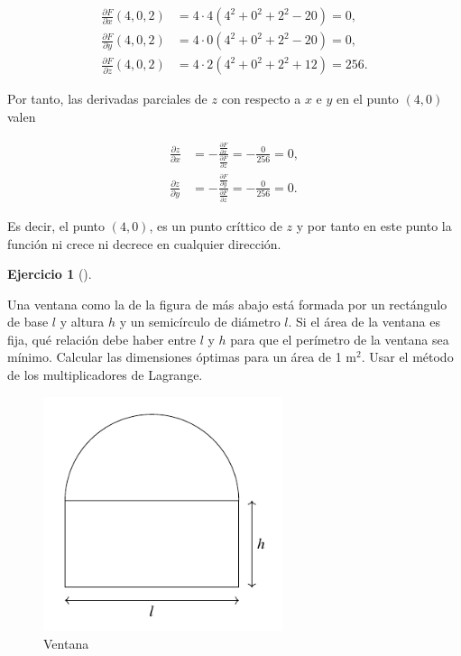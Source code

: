 \documentclass[
  a4paper,
]{scrreport}
\theoremstyle{definition}
\newtheorem{exercise}{Ejercicio}[chapter]
\theoremstyle{remark}
\begin{document}
\begin{tcolorbox}
\begin{enumerate}
  \begin{align*}
  \frac{\partial F}{\partial x}(4,0,2)
  &= 4\cdot 4(4^2+0^2+2^2-20) = 0, \\
  \frac{\partial F}{\partial y}(4,0,2)
  &= 4\cdot 0(4^2+0^2+2^2-20) = 0, \\
  \frac{\partial F}{\partial z}(4,0,2)
  &= 4\cdot 2(4^2+0^2+2^2+12) = 256.
  \end{align*}

  Por tanto, las derivadas parciales de \(z\) con respecto a \(x\) e
  \(y\) en el punto \((4,0)\) valen

  \begin{align*}
  \frac{\partial z}{\partial x}
  &= -\frac{\frac{\partial F}{\partial x}}{\frac{\partial F}{\partial z}}
  = -\frac{0}{256} = 0, \\
  \frac{\partial z}{\partial y}
  &= -\frac{\frac{\partial F}{\partial y}}{\frac{\partial F}{\partial z}}
  = -\frac{0}{256} = 0.
  \end{align*}

  Es decir, el punto \((4,0)\), es un punto críttico de \(z\) y por
  tanto en este punto la función ni crece ni decrece en cualquier
  dirección.
\end{enumerate}

\end{tcolorbox}

\begin{exercise}[]\protect\hypertarget{exr-4}{}\label{exr-4}

Una ventana como la de la figura de más abajo está formada por un
rectángulo de base \(l\) y altura \(h\) y un semicírculo de diámetro
\(l\). Si el área de la ventana es fija, qué relación debe haber entre
\(l\) y \(h\) para que el perímetro de la ventana sea mínimo. Calcular
las dimensiones óptimas para un área de 1 m\(^2\). Usar el método de los
multiplicadores de Lagrange.

\begin{figure}[H]

{\centering \includegraphics[width=7cm,height=\textheight,keepaspectratio]{img/examen-2024-12-20/ventana.pdf}

}

\caption{Ventana}

\end{figure}%

\end{exercise}
\end{document}
